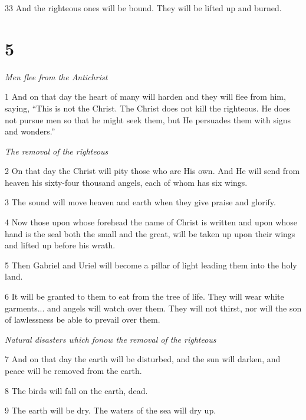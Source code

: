 \par 33 And the righteous ones will be bound. They will be lifted up and burned.

\chapter{5}

\par \textit{Men flee from the Antichrist}

\par 1 And on that day the heart of many will harden and they will flee from him, saying, “This is not the Christ. The Christ does not kill the righteous. He does not pursue men so that he might seek them, but He persuades them with signs and wonders.”

\par \textit{The removal of the righteous}

\par 2 On that day the Christ will pity those who are His own. And He will send from heaven his sixty-four thousand angels, each of whom has six wings.

\par 3 The sound will move heaven and earth when they give praise and glorify.

\par 4 Now those upon whose forehead the name of Christ is written and upon whose hand is the seal both the small and the great, will be taken up upon their wings and lifted up before his wrath.

\par 5 Then Gabriel and Uriel will become a pillar of light leading them into the holy land.

\par 6 It will be granted to them to eat from the tree of life. They will wear white garments... and angels will watch over them. They will not thirst, nor will the son of lawlessness be able to prevail over them.

\par \textit{Natural disasters which fonow the removal of the righteous}

\par 7 And on that day the earth will be disturbed, and the sun will darken, and peace will be removed from the earth.

\par 8 The birds will fall on the earth, dead.

\par 9 The earth will be dry. The waters of the sea will dry up.

